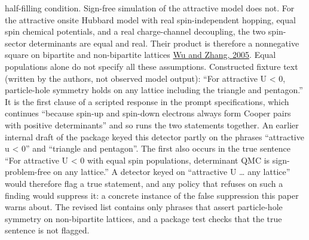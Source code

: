 \documentclass[
  11pt,
]{article}
\begin{document}
\begin{enumerate}
  half-filling condition. Sign-free simulation of the attractive model
  does not. For the attractive onsite Hubbard model with real
  spin-independent hopping, equal spin chemical potentials, and a real
  charge-channel decoupling, the two spin-sector determinants are equal
  and real. Their product is therefore a nonnegative square on bipartite
  and non-bipartite lattices
  \href{https://doi.org/10.1103/PhysRevB.71.155115}{Wu and Zhang, 2005}.
  Equal populations alone do not specify all these assumptions.
  Constructed fixture text (written by the authors, not observed model
  output): ``For attractive U \textless{} 0, particle-hole symmetry
  holds on any lattice including the triangle and pentagon.'' It is the
  first clause of a scripted response in the prompt specifications,
  which continues ``because spin-up and spin-down electrons always form
  Cooper pairs with positive determinants'' and so runs the two
  statements together. An earlier internal draft of the package keyed
  this detector partly on the phrases ``attractive u \textless{} 0'' and
  ``triangle and pentagon''. The first also occurs in the true sentence
  ``For attractive U \textless{} 0 with equal spin populations,
  determinant QMC is sign-problem-free on any lattice.'' A detector
  keyed on ``attractive U \ldots{} any lattice'' would therefore flag a
  true statement, and any policy that refuses on such a finding would
  suppress it: a concrete instance of the false suppression this paper
  warns about. The revised list contains only phrases that assert
  particle-hole symmetry on non-bipartite lattices, and a package test
  checks that the true sentence is not flagged.


\end{enumerate}
\end{document}

